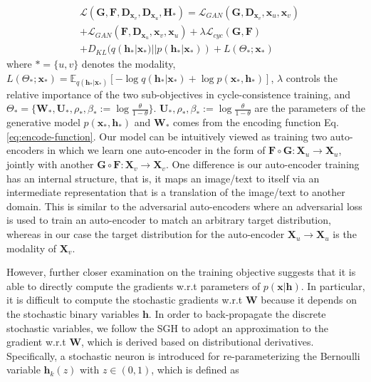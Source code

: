 \documentclass[10pt,journal,twocolumn]{IEEEtran}
\begin{document}
\begin{equation}\label{eq:objective}
\begin{split}
     & \mathcal{L} (\boldsymbol G, \boldsymbol F, \boldsymbol D_{\boldsymbol x_v}, \boldsymbol D_{\boldsymbol x_u} , \boldsymbol H_{\ast})= \mathcal{L}_{GAN} (\boldsymbol G, \boldsymbol D_{\boldsymbol x_v}, \boldsymbol x_u, \boldsymbol x_v) \\
     & + \mathcal{L}_{GAN} (\boldsymbol F, \boldsymbol D_{\boldsymbol x_u}, \boldsymbol x_v, \boldsymbol x_u) + \lambda \mathcal{L}_{cyc}(\boldsymbol G, \boldsymbol F) \\
     & + D_{KL} (q(\boldsymbol h_{\ast}| \boldsymbol x_{\ast}) || p( \boldsymbol h_{\ast} | \boldsymbol x_{\ast})) + L(\Theta_{\ast}; \boldsymbol x_{\ast})
\end{split}
\end{equation}
where $\ast=\{u,v\}$ denotes the modality, $L(\Theta_{\ast}; \boldsymbol x_{\ast})=\mathbb{E}_{q(\boldsymbol h_{\ast}| \boldsymbol x_{\ast})}\left[ -\log q(\boldsymbol h_{\ast}| \boldsymbol x_{\ast}) + \log p(\boldsymbol x_{\ast},\boldsymbol h_{\ast} ) \right]$, $\lambda$ controls the relative importance of the two sub-objectives in cycle-consistence training, and $\Theta_{\ast}=\{ \boldsymbol W_{\ast}, \boldsymbol U_{\ast}, \rho_{\ast}, \beta_{\ast}:=\log \frac{\theta}{1-\theta}\}$. $\boldsymbol U_{\ast}, \rho_{\ast}, \beta_{\ast}:=\log \frac{\theta}{1-\theta}$ are the parameters of the generative model $p(\boldsymbol x_{\ast},\boldsymbol h_{\ast})$ and $\boldsymbol W_{\ast}$ comes from the encoding function Eq. \eqref{eq:encode-function}. Our model can be intuitively viewed as training two auto-encoders in which we learn one auto-encoder in the form of $\boldsymbol F \circ \boldsymbol G: \boldsymbol X_u \rightarrow \boldsymbol X_u$, jointly with another $\boldsymbol G \circ \boldsymbol F: \boldsymbol X_v \rightarrow \boldsymbol X_v$. One difference is our auto-encoder training has an internal structure, that is, it maps an image/text to itself via an intermediate representation that is a translation of the image/text to another domain. This is similar to the adversarial auto-encoders \cite{AAE} where an adversarial loss is used to train an auto-encoder to match an arbitrary target distribution, whereas in our case the target distribution for the auto-encoder $\boldsymbol X_u \rightarrow \boldsymbol X_u$ is the modality of $\boldsymbol X_v$.


However, further closer examination on the training objective suggests that it is able to directly compute the gradients w.r.t parameters of $p(\boldsymbol x | \boldsymbol h)$. In particular, it is difficult to compute the stochastic gradients w.r.t $\boldsymbol W$ because it depends on the stochastic binary variables $\boldsymbol h$. In order to back-propagate the discrete stochastic variables, we follow the SGH \cite{SGH} to adopt an approximation to the gradient w.r.t $\boldsymbol W$, which is derived based on distributional derivatives. Specifically, a stochastic neuron is introduced for re-parameterizing the Bernoulli variable $\boldsymbol h_k(z)$ with $z\in (0,1)$, which is defined as
\end{document}
